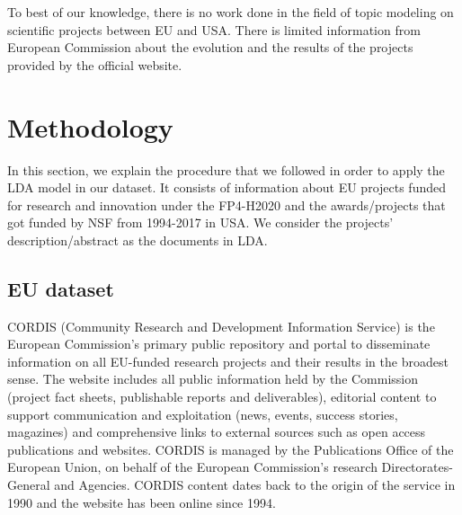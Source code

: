 \documentclass[12pt]{report}
\begin{document}
To best of our knowledge, there is no work done in the field of topic modeling
on scientific projects between EU and USA. There is limited information from
European Commission about the evolution and the results of the projects provided
by the official website.

\section{Methodology}
\label{methodology}
In this section, we explain the procedure that we followed in order to
apply the LDA model in our dataset. It consists of information about 
EU projects funded for research and innovation under the FP4-H2020 
and the awards/projects that got funded by NSF from 1994-2017 in USA. We
consider the projects' description/abstract as the documents in LDA.

\subsection{EU dataset}

CORDIS (Community Research and Development Information Service) is the European
Commission's primary public repository and portal to disseminate information on
all EU-funded research projects and their results in the broadest sense. The
website includes all public information held by the Commission (project
fact sheets, publishable reports and deliverables), editorial content to support
communication and exploitation (news, events, success stories, magazines) and
comprehensive links to external sources such as open access publications and
websites. CORDIS is managed by the Publications Office of the European Union, on
behalf of the European Commission's research Directorates-General and Agencies.
CORDIS content dates back to the origin of the service in 1990 and the website
has been online since 1994.
\end{document}
